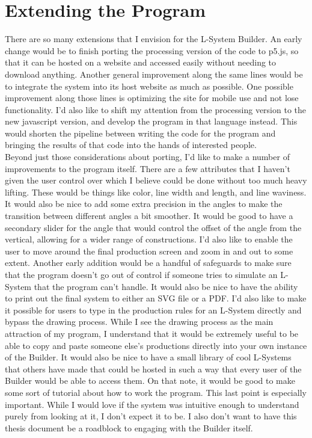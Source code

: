 \documentclass[12pt,twoside]{reedthesis}
\begin{document}
\section{Extending the Program}

	There are so many extensions that I envision for the L-System Builder. An early change would be to finish porting the processing version of the code to p5.js, so that it can be hosted on a website and accessed easily without needing to download anything. Another general improvement along the same lines would be to integrate the system into its host website as much as possible. One possible improvement along those lines is optimizing the site for mobile use and not lose functionality. I'd also like to shift my attention from the processing version to the new javascript version, and develop the program in that language instead. This would shorten the pipeline between writing the code for the program and bringing the results of that code into the hands of interested people.\\
	
	Beyond just those considerations about porting, I'd like to make a number of improvements to the program itself. There are a few attributes that I haven't given the user control over which I believe could be done without too much heavy lifting. These would be things like color, line width and length, and line waviness. It would also be nice to add some extra precision in the angles to make the transition between different angles a bit smoother. It would be good to have a secondary slider for the angle that would control the offset of the angle from the vertical, allowing for a wider range of constructions. I'd also like to enable the user to move around the final production screen and zoom in and out to some extent. Another early addition would be a handful of safeguards to make sure that the program doesn't go out of control if someone tries to simulate an L-System that the program can't handle. It would also be nice to have the ability to print out the final system to either an SVG file or a PDF. I'd also like to make it possible for users to type in the production rules for an L-System directly and bypass the drawing process. While I see the drawing process as the main attraction of my program, I understand that it would be extremely useful to be able to copy and paste someone else's productions directly into your own instance of the Builder. It would also be nice to have a small library of cool L-Systems that others have made that could be hosted in such a way that every user of the Builder would be able to access them. On that note, it would be good to make some sort of tutorial about how to work the program. This last point is especially important. While I would love if the system was intuitive enough to understand purely from looking at it, I don't expect it to be. I also don't want to have this thesis document be a roadblock to engaging with the Builder itself.\\
	
\end{document}
